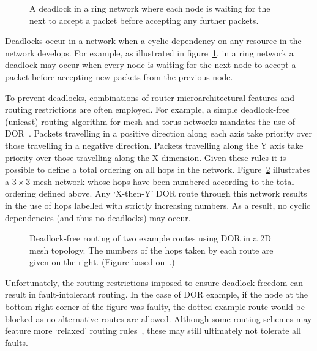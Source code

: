 			\begin{figure}
				\center
				
				\caption[A deadlock in a ring network.]%
				{A deadlock in a ring network where each node is waiting for
				the next to accept a packet before accepting any further packets.}
				\label{fig:ring-deadlock}
			\end{figure}
			
			Deadlocks occur in a network when a cyclic dependency on any resource in
			the network develops. For example, as illustrated in
			figure~\ref{fig:ring-deadlock}, in a ring network a deadlock may occur
			when every node is waiting for the next node to accept a packet before
			accepting new packets from the previous node.
			
			To prevent deadlocks, combinations of router microarchitectural features
			and routing restrictions are often employed. For example, a simple
			deadlock-free (unicast) routing algorithm for mesh and torus networks
			mandates the use of DOR~\cite[chapter~14]{dally04}. Packets travelling in
			a positive direction along each axis take priority over those travelling
			in a negative direction. Packets travelling along the Y axis take
			priority over those travelling along the X dimension. Given these rules
			it is possible to define a total ordering on all hops in the network.
			Figure~\ref{fig:deadlock-free-dor} illustrates a $3\times3$ mesh network
			whose hops have been numbered according to the total ordering defined
			above.  Any `X-then-Y' DOR route through this network results in the use
			of hops labelled with strictly increasing numbers. As a result, no cyclic
			dependencies (and thus no deadlocks) may occur.
			
			\begin{figure}
				\center
			
				\caption[Deadlock-free routing using DOR in a 2D mesh topology.]%
				{Deadlock-free routing of two example routes using DOR in a 2D mesh
				topology. The numbers of the hops taken by each route are given on the
				right. (Figure based on~\cite[figure~14.12]{dally04}.)}
				\label{fig:deadlock-free-dor}
			\end{figure}
			
			Unfortunately, the routing restrictions imposed to ensure deadlock
			freedom can result in fault-intolerant routing. In the case of DOR
			example, if the node at the bottom-right corner of the figure was faulty,
			the dotted example route would be blocked as no alternative routes are
			allowed. Although some routing schemes may feature more `relaxed' routing
			rules~\cite{rodrigo09}, these may still ultimately not tolerate all
			faults.
			

